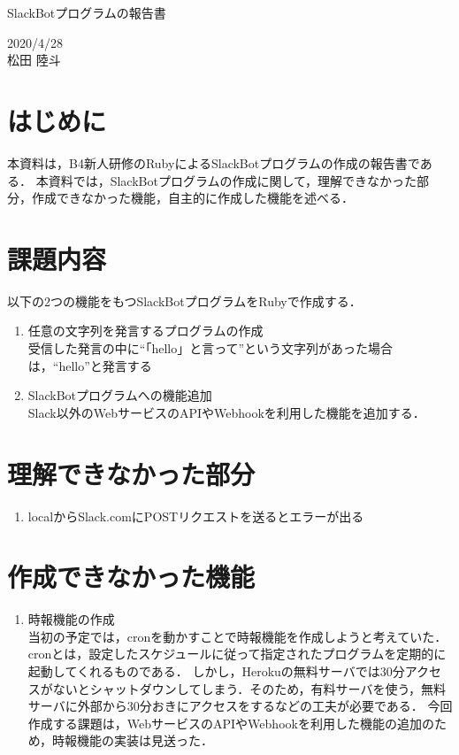 \documentclass[12pt]{jsarticle}
\begin{document}
\begin{center}
{\LARGE SlackBotプログラムの報告書}
\end{center}

\begin{flushright}
  2020/4/28\\
  松田 陸斗
\end{flushright}
\section{はじめに}
\label{sec:introduction}
本資料は，B4新人研修のRubyによるSlackBotプログラムの作成の報告書である．
本資料では，SlackBotプログラムの作成に関して，理解できなかった部分，作成できなかった機能，自主的に作成した機能を述べる．

\section{課題内容}
以下の2つの機能をもつSlackBotプログラムをRubyで作成する．
\begin{enumerate}
\item 任意の文字列を発言するプログラムの作成\\
受信した発言の中に``「hello」と言って''という文字列があった場合は，``hello''と発言する
\item SlackBotプログラムへの機能追加\\
Slack以外のWebサービスのAPIやWebhookを利用した機能を追加する．
\end{enumerate}

\section{理解できなかった部分}
\begin{enumerate}
\item 	localからSlack.comにPOSTリクエストを送るとエラーが出る\\
\end{enumerate}

\section{作成できなかった機能}
\begin{enumerate}
\item 時報機能の作成\\
当初の予定では，cronを動かすことで時報機能を作成しようと考えていた．
cronとは，設定したスケジュールに従って指定されたプログラムを定期的に起動してくれるものである．
しかし，Herokuの無料サーバでは30分アクセスがないとシャットダウンしてしまう．そのため，有料サーバを使う，無料サーバに外部から30分おきにアクセスをするなどの工夫が必要である．
今回作成する課題は，WebサービスのAPIやWebhookを利用した機能の追加のため，時報機能の実装は見送った．
\end{enumerate}
\end{document}
